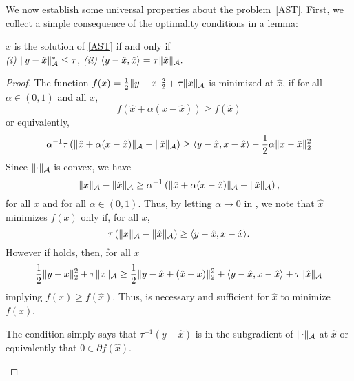 We now establish some universal properties about the problem~\eqref{AST}.
First, we collect a simple consequence of the optimality conditions in a lemma:

\begin{lemma}
\label{lem:optimality-conditions}
$\hat{x}$ is the solution of \eqref{AST} if and only if\\
\emph{(i)}  $\lVert y - \hat{x}\rVert_{\mathcal{A}}^* \leq \tau$,
\emph{(ii)} $\langle y - \hat{x}, \hat{x}\rangle = \tau \lVert\hat{x}\rVert_{\mathcal{A}}.$
\end{lemma}
\begin{proof}
The function $f(x) = \tfrac{1}{2}\lVert y - x\rVert_2^2 + \tau\lVert x\rVert_{\mathcal{A}}$ is minimized at $\hat{x}$, if for all $\alpha \in (0,1)$ and all $x$,
\begin{equation*}
f(\hat{x} + \alpha(x - \hat{x})) \geq f(\hat{x})
\end{equation*}
or equivalently,
\begin{equation}
 \alpha^{-1} \tau \left(\lVert\hat{x} + \alpha(x - \hat{x})\rVert_{\mathcal{A}} - \lVert\hat{x}\rVert_{\mathcal{A}}  \right) \geq \langle y - \hat{x}, x - \hat{x}\rangle - \frac{1}{2}\alpha \lVert x - \hat{x}\rVert_2^2\label{eq:limit}
\end{equation}
Since $\lVert\cdot\rVert_{\mathcal{A}}$ is convex, we have
\[
\lVert x\rVert_{\mathcal{A}} - \lVert\hat{x}\rVert_{\mathcal{A}} \geq \alpha^{-1}  \left(\lVert\hat{x} + \alpha(x - \hat{x})\rVert_{\mathcal{A}} - \lVert\hat{x}\rVert_{\mathcal{A}} \right),
\]
for all $x$ and for all $\alpha \in (0,1)$. Thus, by letting $\alpha \to 0$ in , we note that $\hat{x}$ minimizes $f(x)$ only if, for all $x$,
\begin{equation}
\tau \left( \lVert x\rVert_{\mathcal{A}} - \lVert\hat{x}\rVert_{\mathcal{A}} \right) \geq \langle y - \hat{x}, x - \hat{x}\rangle.\label{eq:subgradient}
\end{equation}
However if  holds, then, for all $x$
\begin{align*}
\frac{1}{2}\| y - x \|_2^2 + \tau \lVert x\rVert_{\mathcal{A}}
\geq \frac{1}{2}\| y - \hat{x} + (\hat{x} - x) \|_2^2 + \langle y - \hat{x}, x - \hat{x}\rangle + \tau \lVert\hat{x}\rVert_{\mathcal{A}}
 \end{align*}
implying $f(x) \geq f(\hat{x}).$
Thus,  is necessary and sufficient for $\hat{x}$ to minimize $f(x)$. 
\begin{note}
The condition  simply says that $\tau^{-1} \left(y - \hat{x} \right)$ is in the subgradient of $\lVert\cdot\rVert_{\mathcal{A}}$ at $\hat{x}$ or equivalently that $0 \in \partial f(\hat{x})$.
\end{note}


\end{proof}
